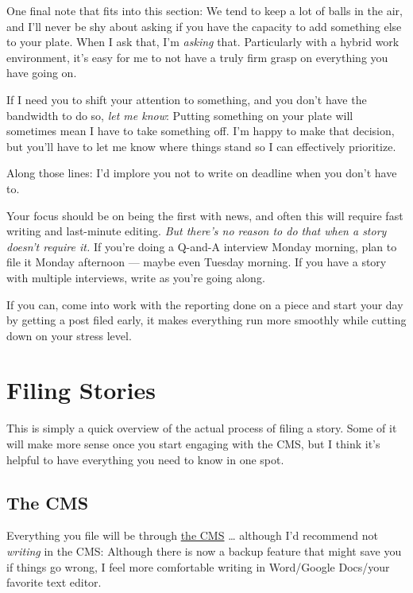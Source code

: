 \documentclass[
  11pt,
  american,
  letterpaperpaper,
  extrafontsizes,onecolumn,openright
  ]{memoir}
\begin{document}
One final note that fits into this section: We tend to keep a lot of balls in the air, and I'll never be shy about asking if you have the capacity to add something else to your plate. When I ask that, I'm \emph{asking} that. Particularly with a hybrid work environment, it's easy for me to not have a truly firm grasp on everything you have going on.

If I need you to shift your attention to something, and you don't have the bandwidth to do so, \emph{let me know}: Putting something on your plate will sometimes mean I have to take something off. I'm happy to make that decision, but you'll have to let me know where things stand so I can effectively prioritize.

Along those lines: I'd implore you not to write on deadline when you don't have to.

Your focus should be on being the first with news, and often this will require fast writing and last-minute editing. \emph{But there's no reason to do that when a story doesn't require it.} If you're doing a Q-and-A interview Monday morning, plan to file it Monday afternoon --- maybe even Tuesday morning. If you have a story with multiple interviews, write as you're going along.

If you can, come into work with the reporting done on a piece and start your day by getting a post filed early, it makes everything run more smoothly while cutting down on your stress level.

\hypertarget{filing-stories}{%
\chapter{Filing Stories}\label{filing-stories}}

This is simply a quick overview of the actual process of filing a story. Some of it will make more sense once you start engaging with the CMS, but I think it's helpful to have everything you need to know in one spot.

\hypertarget{the-cms}{%
\section*{The CMS}\label{the-cms}}

Everything you file will be through \href{https://cms.bizj.us/}{the CMS} \ldots{} although I'd recommend not \emph{writing} in the CMS: Although there is now a backup feature that might save you if things go wrong, I feel more comfortable writing in Word/Google Docs/your favorite text editor.
\end{document}
